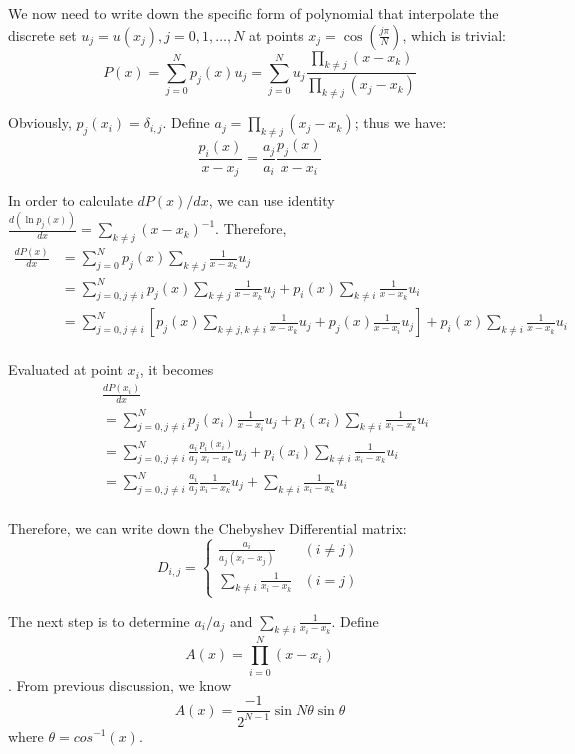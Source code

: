   We now need to write down the specific form of polynomial that interpolate the discrete set
  $u_{j}=u(x_j),j=0,1,\dots,N$ at points $x_{j}=\cos(\frac{j\pi}{N})$, which is trivial:
  \begin{equation}
   P(x)=\sum_{j=0}^{N}p_{j}(x)u_{j}=\sum_{j=0}^{N}u_{j}\frac{\prod_{k\neq j}(x-x_{k})}{\prod_{k\neq j}(x_{j}-x_{k})}
  \end{equation}

  Obviously, $p_{j}(x_{i})=\delta_{i,j}$. Define $a_{j}=\prod_{k\neq j}(x_{j}-x_{k})$; thus we have:
  \[
   \frac{p_{i}(x)}{x-x_{j}}=\frac{a_j}{a_i} \frac{p_{j}(x)}{x-x_{i}}
  \]

  In order to calculate $dP(x)/dx$, we can use
  identity $\frac{d(\ln p_{j}(x))}{dx}=\sum_{k\neq j}(x-x_{k})^{-1}$. Therefore,
  \begin{align*}
   \frac{dP(x)}{dx} &= \sum_{j=0}^{N}p_{j}(x)\sum_{k\neq j}\frac{1}{x-x_{k}}u_{j}\\
   &=  \sum_{j=0,j\neq i}^{N}p_{j}(x)\sum_{k\neq j}\frac{1}{x-x_{k}}u_{j}+
   p_{i}(x)\sum_{k\neq i}\frac{1}{x-x_{k}}u_{i}\\
   &=  \sum_{j=0,j\neq i}^{N}[p_{j}(x)\sum_{k\neq j,k\neq i}\frac{1}{x-x_{k}}u_{j}+
   p_{j}(x)\frac{1}{x-x_{i}}u_{j}]+p_{i}(x)\sum_{k\neq i}\frac{1}{x-x_{k}}u_{i}\\
  \end{align*}

  Evaluated at point $x_{i}$, it becomes
  \begin{align*}
   & \frac{dP(x_{i})}{dx}\\
   & =\sum_{j=0,j\neq i}^{N} p_{j}(x_{i})\frac{1}{x-x_{i}}u_{j}
   +p_{i}(x_{i})\sum_{k\neq i}\frac{1}{x_{i}-x_{k}}u_{i}\\
   & =\sum_{j=0,j\neq i}^{N}\frac{a_i}{a_j}\frac{p_{i}(x_{i})}{x_{i}-x_{k}}u_{j}
   +p_{i}(x_{i})\sum_{k\neq i}\frac{1}{x_{i}-x_{k}}u_{i}\\
   & =\sum_{j=0,j\neq i}^{N}\frac{a_i}{a_j}\frac{1}{x_{i}-x_{k}}u_{j}
   +\sum_{k\neq i}\frac{1}{x_{i}-x_{k}}u_{i}\\
  \end{align*}

  Therefore, we can write down the Chebyshev Differential matrix:
  \[
   D_{i,j}=
   \begin{cases}
    \frac{a_{i}}{a_{j}(x_{i}-x_{j})} & (i\neq j)\\
    \sum_{k\neq i}\frac{1}{x_{i}-x_{k}} & (i=j)
   \end{cases}
  \]

  The next step is to determine $a_{i}/a_{j}$ and $\sum_{k\neq i}\frac{1}{x_{i}-x_{k}}$. Define
  $$A(x)=\prod_{i=0}^{N}(x-x_{i})$$. From previous discussion, we know
  \[
   A(x)=\frac{-1}{2^{N-1}}\sin N\theta\sin\theta
  \]
  where $\theta=cos^{-1}(x)$.

